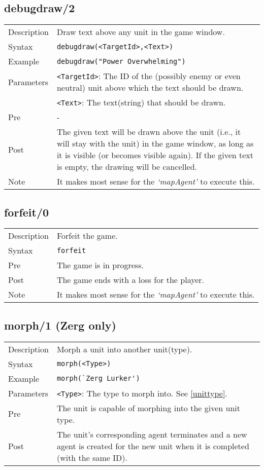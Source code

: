\subsection{debugdraw/2}
\begin{tabularx}{\textwidth}{lX}
 Description & Draw text above any unit in the game window. \\
 Syntax & \verb|debugdraw(<TargetId>,<Text>)| \\
 Example & \verb|debugdraw("Power Overwhelming")| \\
 Parameters & \verb|<TargetId>|: The ID of the (possibly enemy or even neutral) unit above which the text should be drawn. \\
 			& \verb|<Text>|: The text(string) that should be drawn. \\
 Pre & - \\
 Post & The given text will be drawn above the unit (i.e., it will stay with the unit) in the game window, as long as it is visible (or becomes visible again). If the given text is empty, the drawing will be cancelled. \\
 Note & It makes most sense for the \textit{`mapAgent'} to execute this.
\end{tabularx}

\subsection{forfeit/0}
\begin{tabularx}{\textwidth}{lX}
 Description & Forfeit the game. \\
 Syntax & \verb|forfeit| \\
 Pre & The game is in progress. \\
 Post & The game ends with a loss for the player. \\
 Note & It makes most sense for the \textit{`mapAgent'} to execute this.
\end{tabularx}

\subsection{morph/1 (Zerg only)}
\begin{tabularx}{\textwidth}{lX}
 Description & Morph a unit into another unit(type). \\
 Syntax & \verb|morph(<Type>)| \\
 Example & \verb|morph(`Zerg Lurker')| \\
 Parameters & \verb|<Type>|: The type to morph into. See \ref{unittype}. \\
 Pre & The unit is capable of morphing into the given unit type. \\
 Post & The unit's corresponding agent terminates and a new agent is created for the new unit when it is completed (with the same ID).
\end{tabularx}

